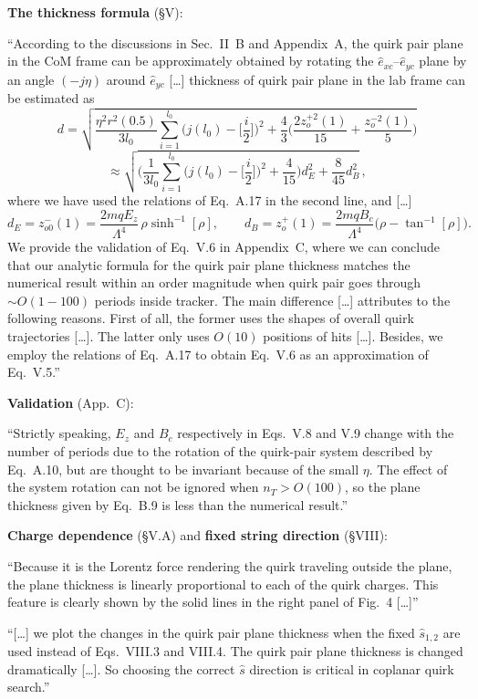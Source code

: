 \documentclass[11pt]{article}
\begin{document}
\noindent\textbf{The thickness formula} (\S V):
\begin{srcquote}
``According to the discussions in Sec.~II~B and Appendix~A, the quirk pair plane in the CoM frame can be approximately
obtained by rotating the $\hat e_{xc}$--$\hat e_{yc}$ plane by an angle $(-j\eta)$ around $\hat e_{yc}$ [\dots] thickness
of quirk pair plane in the lab frame can be estimated as
\[
  d=\sqrt{\frac{\eta^2r^2(0.5)}{3l_0}\sum_{i=1}^{l_0}\Big(j(l_0)-\Big[\frac i2\Big]\Big)^2
  +\frac43\Big(\frac{2z^{+2}_o(1)}{15}+\frac{z^{-2}_o(1)}{5}\Big)}\tag{Li20 V.5}
\]
\[
  \approx\sqrt{\Big(\frac{1}{3l_0}\sum_{i=1}^{l_0}\Big(j(l_0)-\Big[\frac i2\Big]\Big)^2+\frac4{15}\Big)d_E^2+\frac8{45}d_B^2}\,,\tag{Li20 V.6}
\]
where we have used the relations of Eq.~A.17 in the second line, and [\dots]
\[
  d_E=z^-_{o0}(1)=\frac{2mqE_z}{\Lambda^4}\,\rho\sinh^{-1}[\rho],\qquad
  d_B=z^+_o(1)=\frac{2mqB_c}{\Lambda^4}\big(\rho-\tan^{-1}[\rho]\big).\tag{Li20 V.8, V.9}
\]
We provide the validation of Eq.~V.6 in Appendix~C, where we can conclude that our analytic formula for the quirk pair
plane thickness matches the numerical result within an order magnitude when quirk pair goes through $\sim O(1-100)$
periods inside tracker. The main difference [\dots] attributes to the following reasons. First of all, the former uses
the shapes of overall quirk trajectories [\dots]. The latter only uses $O(10)$ positions of hits [\dots]. Besides, we
employ the relations of Eq.~A.17 to obtain Eq.~V.6 as an approximation of Eq.~V.5.''
\end{srcquote}

\noindent\textbf{Validation} (App.~C):
\begin{srcquote}
``Strictly speaking, $E_z$ and $B_c$ respectively in Eqs.~V.8 and V.9 change with the number of periods due to the
rotation of the quirk-pair system described by Eq.~A.10, but are thought to be invariant because of the small $\eta$. The
effect of the system rotation can not be ignored when $n_T>O(100)$, so the plane thickness given by Eq.~B.9 is less than
the numerical result.''
\end{srcquote}

\noindent\textbf{Charge dependence} (\S V.A) and \textbf{fixed string direction} (\S VIII):
\begin{srcquote}
``Because it is the Lorentz force rendering the quirk traveling outside the plane, the plane thickness is linearly
proportional to each of the quirk charges. This feature is clearly shown by the solid lines in the right panel of
Fig.~4 [\dots]''

``[\dots] we plot the changes in the quirk pair plane thickness when the fixed $\hat s_{1,2}$ are used instead of
Eqs.~VIII.3 and VIII.4. The quirk pair plane thickness is changed dramatically [\dots]. So choosing the correct $\hat s$
direction is critical in coplanar quirk search.''
\end{srcquote}
\end{document}
